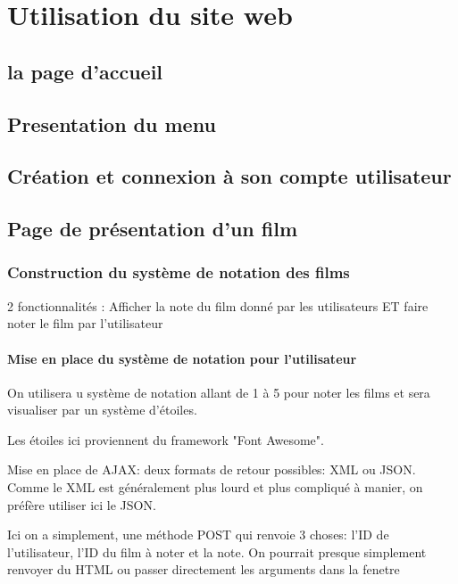\documentclass[a4paper, 11pt]{MyReport}
\begin{document}
	\chapter{Utilisation du site web}

		\section{la page d'accueil}

		\section{Presentation du menu}

		\section{Création et connexion à son compte utilisateur}


		\section{Page de présentation d'un film}

			\subsection{Construction du système de notation des films}
				2 fonctionnalités : Afficher la note du film donné par les utilisateurs ET faire noter le film par l'utilisateur

				\subsubsection{Mise en place du système de notation pour l'utilisateur}

					On utilisera u système de notation allant de 1 à 5 pour noter les films et sera visualiser par un système d'étoiles.

					Les étoiles ici proviennent du framework "Font Awesome".

					\bigskip
					Mise en place de AJAX: deux formats de retour possibles: XML ou JSON. Comme le XML est généralement plus lourd et plus compliqué à manier, on préfère utiliser ici le JSON.

					Ici on a simplement, une méthode POST qui renvoie 3 choses: l'ID de l'utilisateur, l'ID du film à noter et la note. On pourrait presque simplement renvoyer du HTML ou passer directement les arguments dans la fenetre
\end{document}
